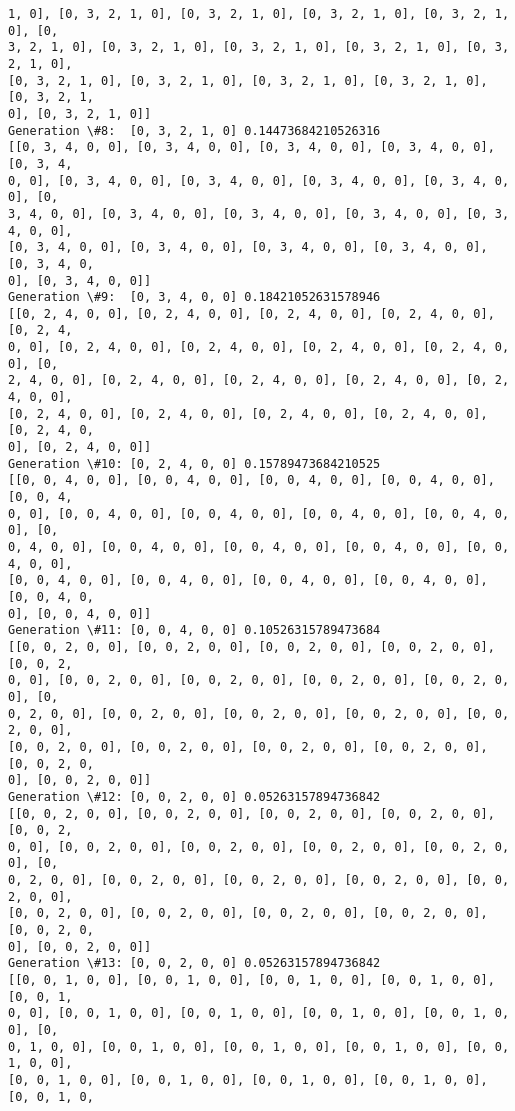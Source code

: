 \documentclass[11pt]{article}
\begin{document}
\begin{Verbatim}[commandchars=\\\{\}]
1, 0], [0, 3, 2, 1, 0], [0, 3, 2, 1, 0], [0, 3, 2, 1, 0], [0, 3, 2, 1, 0], [0,
3, 2, 1, 0], [0, 3, 2, 1, 0], [0, 3, 2, 1, 0], [0, 3, 2, 1, 0], [0, 3, 2, 1, 0],
[0, 3, 2, 1, 0], [0, 3, 2, 1, 0], [0, 3, 2, 1, 0], [0, 3, 2, 1, 0], [0, 3, 2, 1,
0], [0, 3, 2, 1, 0]]
Generation \#8:  [0, 3, 2, 1, 0] 0.14473684210526316
[[0, 3, 4, 0, 0], [0, 3, 4, 0, 0], [0, 3, 4, 0, 0], [0, 3, 4, 0, 0], [0, 3, 4,
0, 0], [0, 3, 4, 0, 0], [0, 3, 4, 0, 0], [0, 3, 4, 0, 0], [0, 3, 4, 0, 0], [0,
3, 4, 0, 0], [0, 3, 4, 0, 0], [0, 3, 4, 0, 0], [0, 3, 4, 0, 0], [0, 3, 4, 0, 0],
[0, 3, 4, 0, 0], [0, 3, 4, 0, 0], [0, 3, 4, 0, 0], [0, 3, 4, 0, 0], [0, 3, 4, 0,
0], [0, 3, 4, 0, 0]]
Generation \#9:  [0, 3, 4, 0, 0] 0.18421052631578946
[[0, 2, 4, 0, 0], [0, 2, 4, 0, 0], [0, 2, 4, 0, 0], [0, 2, 4, 0, 0], [0, 2, 4,
0, 0], [0, 2, 4, 0, 0], [0, 2, 4, 0, 0], [0, 2, 4, 0, 0], [0, 2, 4, 0, 0], [0,
2, 4, 0, 0], [0, 2, 4, 0, 0], [0, 2, 4, 0, 0], [0, 2, 4, 0, 0], [0, 2, 4, 0, 0],
[0, 2, 4, 0, 0], [0, 2, 4, 0, 0], [0, 2, 4, 0, 0], [0, 2, 4, 0, 0], [0, 2, 4, 0,
0], [0, 2, 4, 0, 0]]
Generation \#10: [0, 2, 4, 0, 0] 0.15789473684210525
[[0, 0, 4, 0, 0], [0, 0, 4, 0, 0], [0, 0, 4, 0, 0], [0, 0, 4, 0, 0], [0, 0, 4,
0, 0], [0, 0, 4, 0, 0], [0, 0, 4, 0, 0], [0, 0, 4, 0, 0], [0, 0, 4, 0, 0], [0,
0, 4, 0, 0], [0, 0, 4, 0, 0], [0, 0, 4, 0, 0], [0, 0, 4, 0, 0], [0, 0, 4, 0, 0],
[0, 0, 4, 0, 0], [0, 0, 4, 0, 0], [0, 0, 4, 0, 0], [0, 0, 4, 0, 0], [0, 0, 4, 0,
0], [0, 0, 4, 0, 0]]
Generation \#11: [0, 0, 4, 0, 0] 0.10526315789473684
[[0, 0, 2, 0, 0], [0, 0, 2, 0, 0], [0, 0, 2, 0, 0], [0, 0, 2, 0, 0], [0, 0, 2,
0, 0], [0, 0, 2, 0, 0], [0, 0, 2, 0, 0], [0, 0, 2, 0, 0], [0, 0, 2, 0, 0], [0,
0, 2, 0, 0], [0, 0, 2, 0, 0], [0, 0, 2, 0, 0], [0, 0, 2, 0, 0], [0, 0, 2, 0, 0],
[0, 0, 2, 0, 0], [0, 0, 2, 0, 0], [0, 0, 2, 0, 0], [0, 0, 2, 0, 0], [0, 0, 2, 0,
0], [0, 0, 2, 0, 0]]
Generation \#12: [0, 0, 2, 0, 0] 0.05263157894736842
[[0, 0, 2, 0, 0], [0, 0, 2, 0, 0], [0, 0, 2, 0, 0], [0, 0, 2, 0, 0], [0, 0, 2,
0, 0], [0, 0, 2, 0, 0], [0, 0, 2, 0, 0], [0, 0, 2, 0, 0], [0, 0, 2, 0, 0], [0,
0, 2, 0, 0], [0, 0, 2, 0, 0], [0, 0, 2, 0, 0], [0, 0, 2, 0, 0], [0, 0, 2, 0, 0],
[0, 0, 2, 0, 0], [0, 0, 2, 0, 0], [0, 0, 2, 0, 0], [0, 0, 2, 0, 0], [0, 0, 2, 0,
0], [0, 0, 2, 0, 0]]
Generation \#13: [0, 0, 2, 0, 0] 0.05263157894736842
[[0, 0, 1, 0, 0], [0, 0, 1, 0, 0], [0, 0, 1, 0, 0], [0, 0, 1, 0, 0], [0, 0, 1,
0, 0], [0, 0, 1, 0, 0], [0, 0, 1, 0, 0], [0, 0, 1, 0, 0], [0, 0, 1, 0, 0], [0,
0, 1, 0, 0], [0, 0, 1, 0, 0], [0, 0, 1, 0, 0], [0, 0, 1, 0, 0], [0, 0, 1, 0, 0],
[0, 0, 1, 0, 0], [0, 0, 1, 0, 0], [0, 0, 1, 0, 0], [0, 0, 1, 0, 0], [0, 0, 1, 0,

\end{Verbatim}
\end{document}
